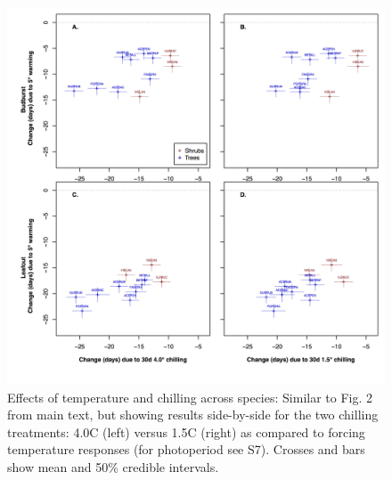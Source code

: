 \documentclass{article}
\begin{document}
\begin{figure}
\label{fig:figS6}
\includegraphics[width=1\textwidth]{FigChill2_4panel.png}
\caption{Effects of temperature and chilling across species: Similar to Fig. 2 from main text, but showing results side-by-side for the two chilling treatments: 4.0\degree C (left) versus 1.5\degree C (right) as compared to forcing temperature responses (for photoperiod see S7). Crosses and bars show mean and 50\% credible intervals.}
\end{figure}
\end{document}
